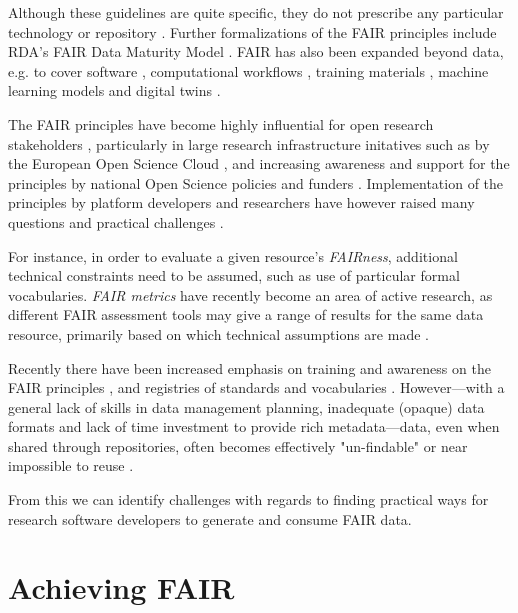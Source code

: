 Although these guidelines are quite specific, they do not prescribe any particular technology or repository \cite{Mons 2017}. Further formalizations of the FAIR principles include RDA's FAIR Data Maturity Model \cite{FAIR Maturity 2020,Bahui 2020}. FAIR has also been expanded beyond data, e.g. to cover software \cite{Katz 2021b}, computational workflows \cite{Goble 2020}, training materials \cite{Garcia 2020a}, machine learning models \cite{Duarte 2023} and digital twins \cite{Schultes 2022}. 

The FAIR principles have become highly influential for open research stakeholders \cite{Jacobsen 2020}, particularly in large research infrastructure initatives such as by the European Open Science Cloud  \cite{Schouppe 2018}, and increasing awareness and support for the principles by national Open Science policies and funders \cite{Davidson 2019,Davidson 2022}.
Implementation of the principles by platform developers and researchers have however raised many questions and practical challenges \cite{Mons 2020,Riungu-Kalliosaari 2022}. 

For instance, in order to evaluate a given resource's \emph{FAIRness}, additional technical constraints need to be assumed, such as use of particular formal vocabularies. \emph{FAIR metrics} \cite{Wilkinson 2018,Devaraju 2021} have recently become an area of active research, as different FAIR assessment tools may give a range of results for the same data resource, primarily based on which technical assumptions are made \cite{Wilkinson 2022a,Verburg 2023}.

Recently there have been increased emphasis on training and awareness on the FAIR principles \cite{Shanahan 2021,Rocca-Serra 2023}, and registries of standards and vocabularies \cite{Sansone 2019}.
However---with a general lack of skills in data management planning, inadequate (opaque) data formats and lack of time investment to provide rich metadata---data, even when shared through repositories, often becomes effectively "un-findable" or near impossible to reuse \cite{Carballo-Garcia 2022}.

From this we can identify challenges with regards to finding practical ways for research software developers to generate and consume FAIR data.


\section{Achieving FAIR}

